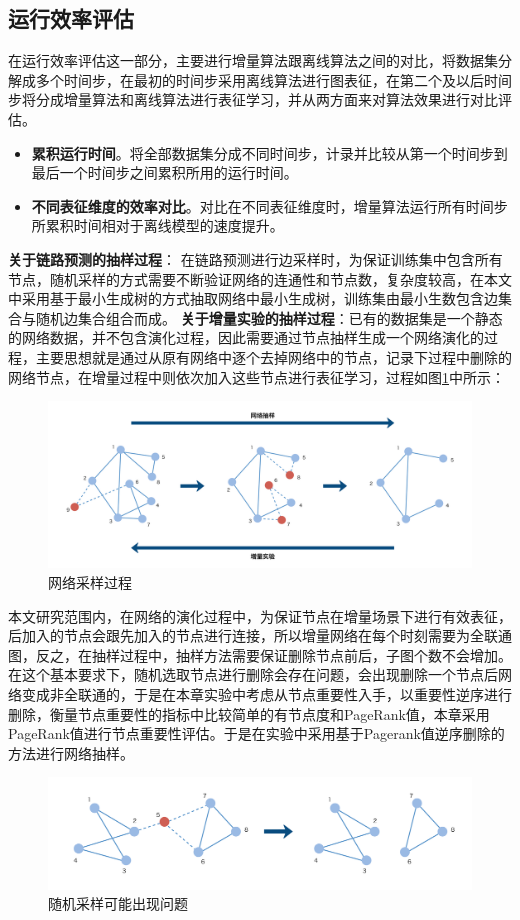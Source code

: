 \subsection{运行效率评估}
在运行效率评估这一部分，主要进行增量算法跟离线算法之间的对比，将数据集分解成多个时间步，在最初的时间步采用离线算法进行图表征，在第二个及以后时间步将分成增量算法和离线算法进行表征学习，并从两方面来对算法效果进行对比评估。
\begin{itemize}
	\item \textbf{累积运行时间}。将全部数据集分成不同时间步，计录并比较从第一个时间步到最后一个时间步之间累积所用的运行时间。
	\item \textbf{不同表征维度的效率对比}。对比在不同表征维度时，增量算法运行所有时间步所累积时间相对于离线模型的速度提升。 
\end{itemize}
\remark \textbf{关于链路预测的抽样过程}：
在链路预测进行边采样时，为保证训练集中包含所有节点，随机采样的方式需要不断验证网络的连通性和节点数，复杂度较高，在本文中采用基于最小生成树的方式抽取网络中最小生成树，训练集由最小生数包含边集合与随机边集合组合而成。
\remark \textbf{关于增量实验的抽样过程}：已有的数据集是一个静态的网络数据，并不包含演化过程，因此需要通过节点抽样生成一个网络演化的过程，主要思想就是通过从原有网络中逐个去掉网络中的节点，记录下过程中删除的网络节点，在增量过程中则依次加入这些节点进行表征学习，过程如图\ref{fig:network_sample}中所示：
\begin{figure}
	\centering
	\includegraphics[width=6.2in]{figures/inc_sample}
	\caption{网络采样过程}
	\label{fig:network_sample}
\end{figure}


本文研究范围内，在网络的演化过程中，为保证节点在增量场景下进行有效表征，后加入的节点会跟先加入的节点进行连接，所以增量网络在每个时刻需要为全联通图，反之，在抽样过程中，抽样方法需要保证删除节点前后，子图个数不会增加。在这个基本要求下，随机选取节点进行删除会存在问题，会出现删除一个节点后网络变成非全联通的，于是在本章实验中考虑从节点重要性入手，以重要性逆序进行删除，衡量节点重要性的指标中比较简单的有节点度和PageRank值\cite{page1999pagerank}，本章采用PageRank值进行节点重要性评估。于是在实验中采用基于Pagerank值逆序删除的方法进行网络抽样。
\begin{figure}
	\centering
	\includegraphics[width=6.2in]{figures/sample_split}
	\caption{随机采样可能出现问题}
\end{figure}


